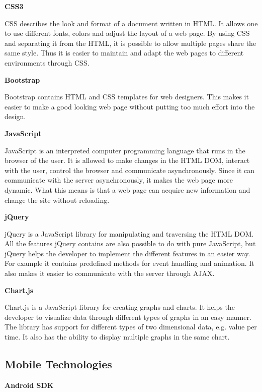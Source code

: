 \textbf{CSS3} \nocite{CSS3}

CSS describes the look and format of a document written in HTML.
It allows one to use different fonts, colors and adjust the layout of a web page.
By using CSS and separating it from the HTML, it is possible to allow multiple pages share the same style.
Thus it is easier to maintain and adapt the web pages to different environments through CSS.

\textbf{Bootstrap} \nocite{Bootstrap}

Bootstrap contains HTML and CSS templates for web designers.
This makes it easier to make a good looking web page without putting too much effort into the design.

\textbf{JavaScript} \nocite{JavaScript}

JavaScript is an interpreted computer programming language that runs in the browser of the user.
It is allowed to make changes in the HTML DOM, interact with the user, control the browser and communicate asynchronously.
Since it can communicate with the server asynchronously, it makes the web page more dynamic.
What this means is that a web page can acquire new information and change the site without reloading.

\textbf{jQuery} \nocite{jQuery}

jQuery is a JavaScript library for manipulating and traversing the HTML DOM.
All the features jQuery contains are also possible to do with pure JavaScript, but jQuery helps the developer to implement the different features in an easier way.
For example it contains predefined methods for event handling and animation.
It also makes it easier to communicate with the server through AJAX.

\textbf{Chart.js} \nocite{Chartjs}

Chart.js is a JavaScript library for creating graphs and charts.
It helps the developer to visualize data through different types of graphs in an easy manner.
The library has support for different types of two dimensional data, e.g. value per time.
It also has the ability to display multiple graphs in the same chart.

\subsection{Mobile Technologies}

\textbf{Android SDK} \nocite{AndroidSDK}


